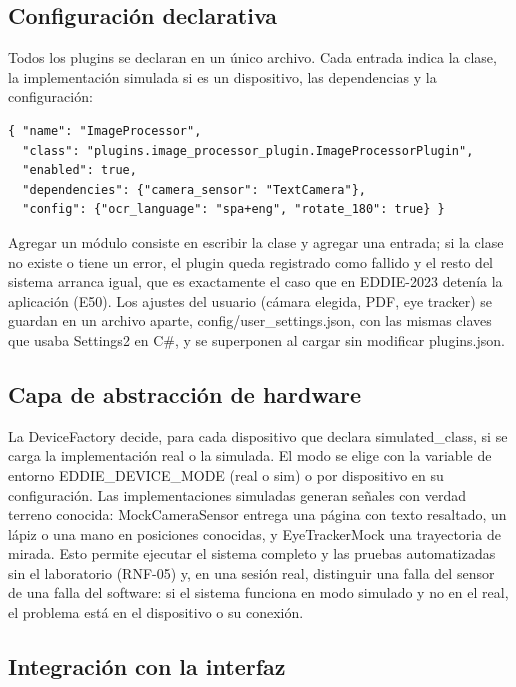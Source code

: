\subsection{Configuración declarativa}

Todos los plugins se declaran en un único archivo. Cada entrada indica la clase, la implementación simulada si es un dispositivo, las dependencias y la configuración:

\begin{verbatim}
{ "name": "ImageProcessor",
  "class": "plugins.image_processor_plugin.ImageProcessorPlugin",
  "enabled": true,
  "dependencies": {"camera_sensor": "TextCamera"},
  "config": {"ocr_language": "spa+eng", "rotate_180": true} }
\end{verbatim}

Agregar un módulo consiste en escribir la clase y agregar una entrada; si la clase no existe o tiene un error, el plugin queda registrado como fallido y el resto del sistema arranca igual, que es exactamente el caso que en EDDIE-2023 detenía la aplicación (E50). Los ajustes del usuario (cámara elegida, PDF, eye tracker) se guardan en un archivo aparte, config/user\_settings.json, con las mismas claves que usaba Settings2 en C\#, y se superponen al cargar sin modificar plugins.json.

\subsection{Capa de abstracción de hardware}

La DeviceFactory decide, para cada dispositivo que declara simulated\_class, si se carga la implementación real o la simulada. El modo se elige con la variable de entorno EDDIE\_DEVICE\_MODE (real o sim) o por dispositivo en su configuración. Las implementaciones simuladas generan señales con verdad terreno conocida: MockCameraSensor entrega una página con texto resaltado, un lápiz o una mano en posiciones conocidas, y EyeTrackerMock una trayectoria de mirada. Esto permite ejecutar el sistema completo y las pruebas automatizadas sin el laboratorio (RNF-05) y, en una sesión real, distinguir una falla del sensor de una falla del software: si el sistema funciona en modo simulado y no en el real, el problema está en el dispositivo o su conexión.

\subsection{Integración con la interfaz}

